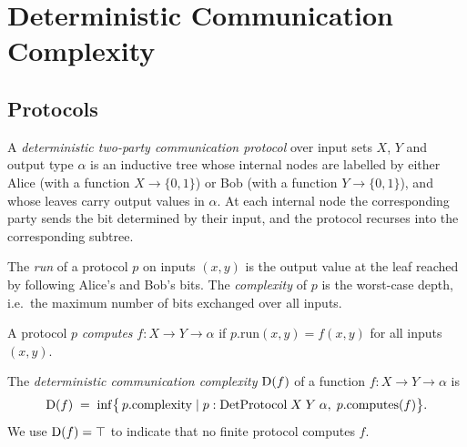 
\chapter{Deterministic Communication Complexity}

\section{Protocols}

\begin{definition}
  \label{def:det_protocol}
  \leanok
  A \emph{deterministic two-party communication protocol} over input sets $X$, $Y$
  and output type $\alpha$ is an inductive tree whose internal nodes are labelled
  by either Alice (with a function $X \to \{0,1\}$) or Bob (with a function
  $Y \to \{0,1\}$), and whose leaves carry output values in $\alpha$.
  At each internal node the corresponding party sends the bit determined by their
  input, and the protocol recurses into the corresponding subtree.
\end{definition}

\begin{definition}
  \label{def:protocol_run}
  \leanok
  \leanok
  The \emph{run} of a protocol $p$ on inputs $(x, y)$ is the output value at the
  leaf reached by following Alice's and Bob's bits.
  The \emph{complexity} of $p$ is the worst-case depth, i.e.\ the maximum number
  of bits exchanged over all inputs.
\end{definition}

\begin{definition}[Computes]
  \label{def:computes}
  \leanok
  A protocol $p$ \emph{computes} $f : X \to Y \to \alpha$ if $p.\mathrm{run}(x,y)
  = f(x,y)$ for all inputs $(x,y)$.
\end{definition}

\begin{definition}
  \label{def:det_cc}
  \leanok
  The \emph{deterministic communication complexity} $\mathrm{D}(f)$ of a function
  $f : X \to Y \to \alpha$ is
  \[
    \mathrm{D}(f) \;=\; \inf \bigl\{\, p.\mathrm{complexity} \mid
      p : \text{DetProtocol}\;X\;Y\;\alpha,\; p.\mathrm{computes}(f) \bigr\}.
  \]
  We use $\mathrm{D}(f) = \top$ to indicate that no finite protocol computes $f$.
\end{definition}

